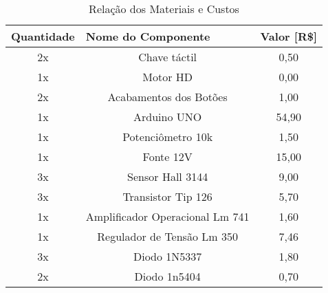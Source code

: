 \documentclass[journal]{IEEEtran}
\begin{document}
\begin{table}[!htpb]
\renewcommand{\arraystretch}{1.3}
\caption{Relação dos Materiais e Custos}
\label{tab:tabela2}
\centering
\begin{tabular}{c|c|c|}
\hline
\multicolumn{1}{|l|}{\textbf{Quantidade}} & \multicolumn{1}{l|}{\textbf{Nome do Componente}} & \multicolumn{1}{l|}{\textbf{Valor {[}R\${]}}} \\ \hline
\multicolumn{1}{|c|}{2x}                  & Chave táctil                                     & 0,50                                          \\ \hline
\multicolumn{1}{|c|}{1x}                  & Motor HD                                         & 0,00                                          \\ \hline
\multicolumn{1}{|c|}{2x}                  & Acabamentos dos Botões                           & 1,00                                          \\ \hline
\multicolumn{1}{|c|}{1x}                  & Arduino UNO                                      & 54,90                                         \\ \hline
\multicolumn{1}{|c|}{1x}                  & Potenciômetro 10k                                & 1,50                                          \\ \hline
\multicolumn{1}{|c|}{1x}                  & Fonte 12V                                        & 15,00                                         \\ \hline
\multicolumn{1}{|c|}{3x}                  & Sensor Hall 3144                                 & 9,00                                          \\ \hline
\multicolumn{1}{|c|}{3x}                  & Transistor Tip 126                               & 5,70                                          \\ \hline
\multicolumn{1}{|c|}{1x}                  & Amplificador Operacional Lm 741                  & 1,60                                          \\ \hline
\multicolumn{1}{|c|}{1x}                  & Regulador de Tensão Lm 350                       & 7,46                                          \\ \hline
\multicolumn{1}{|c|}{3x}                  & Diodo 1N5337                                     & 1,80                                          \\ \hline
\multicolumn{1}{|c|}{2x}                  & Diodo 1n5404                                     & 0,70                                          \\ \hline

\end{tabular}
\end{table}
\end{document}
